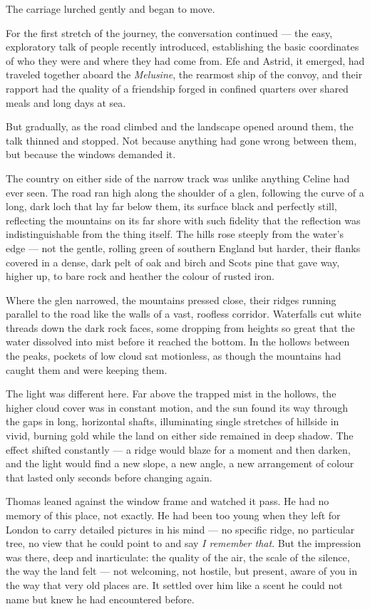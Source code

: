 The carriage lurched gently and began to move.
 
For the first stretch of the journey, the conversation continued --- the easy, exploratory talk of people recently introduced, establishing the basic coordinates of who they were and where they had come from. Efe and Astrid, it emerged, had traveled together aboard the \textit{Melusine}, the rearmost ship of the convoy, and their rapport had the quality of a friendship forged in confined quarters over shared meals and long days at sea.
 
But gradually, as the road climbed and the landscape opened around them, the talk thinned and stopped. Not because anything had gone wrong between them, but because the windows demanded it.
 
The country on either side of the narrow track was unlike anything Celine had ever seen. The road ran high along the shoulder of a glen, following the curve of a long, dark loch that lay far below them, its surface black and perfectly still, reflecting the mountains on its far shore with such fidelity that the reflection was indistinguishable from the thing itself. The hills rose steeply from the water's edge --- not the gentle, rolling green of southern England but harder, their flanks covered in a dense, dark pelt of oak and birch and Scots pine that gave way, higher up, to bare rock and heather the colour of rusted iron.
 
Where the glen narrowed, the mountains pressed close, their ridges running parallel to the road like the walls of a vast, roofless corridor. Waterfalls cut white threads down the dark rock faces, some dropping from heights so great that the water dissolved into mist before it reached the bottom. In the hollows between the peaks, pockets of low cloud sat motionless, as though the mountains had caught them and were keeping them.
 
The light was different here. Far above the trapped mist in the hollows, the higher cloud cover was in constant motion, and the sun found its way through the gaps in long, horizontal shafts, illuminating single stretches of hillside in vivid, burning gold while the land on either side remained in deep shadow. The effect shifted constantly --- a ridge would blaze for a moment and then darken, and the light would find a new slope, a new angle, a new arrangement of colour that lasted only seconds before changing again.
 
Thomas leaned against the window frame and watched it pass. He had no memory of this place, not exactly. He had been too young when they left for London to carry detailed pictures in his mind --- no specific ridge, no particular tree, no view that he could point to and say \textit{I remember that}. But the impression was there, deep and inarticulate: the quality of the air, the scale of the silence, the way the land felt --- not welcoming, not hostile, but present, aware of you in the way that very old places are. It settled over him like a scent he could not name but knew he had encountered before.
 
